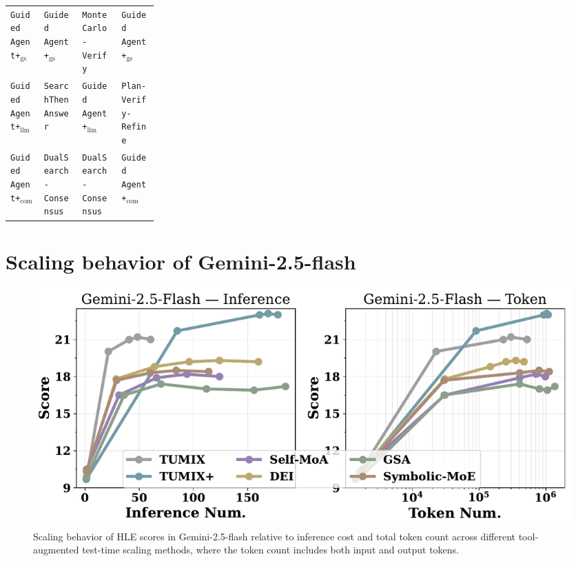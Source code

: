 \begin{table}[!ht]
\begin{tabular}{@{}lllp{0.25\linewidth}@{}}
\texttt{Guided Agent+$_{\text{gs}}$}  & \texttt{Guided Agent+$_{\text{gs}}$}                     & \texttt{MonteCarlo-Verify} & \texttt{Guided Agent+$_{\text{gs}}$} \\
\texttt{Guided Agent+$_{\text{llm}}$}  & \texttt{SearchThenAnswer}                      & \texttt{Guided Agent+$_{\text{llm}}$} & \texttt{Plan-Verify-Refine}\\
\texttt{Guided Agent+$_{\text{com}}$}  & \texttt{DualSearch-Consensus}                      & \texttt{DualSearch-Consensus} & \texttt{Guided Agent+$_{\text{com}}$} \\
\hline
\end{tabular}
\vspace{-2mm}
\end{table}

\newpage
\section{Scaling behavior of Gemini-2.5-flash}
\label{appendix sec: Scaling behavior of Gemini-2.5-flash}
\begin{figure}[ht]
  \centering
  \includegraphics[width=0.8\linewidth]{Figures/scaling_flash_only.pdf}
   \caption{Scaling behavior of HLE scores in Gemini-2.5-flash relative to inference cost and total token count across different tool-augmented test-time scaling methods, where the token count includes both input and output tokens.}
   \label{fig:Scaling behavior of Gemini-2.5-flash}
\end{figure}

\newpage
